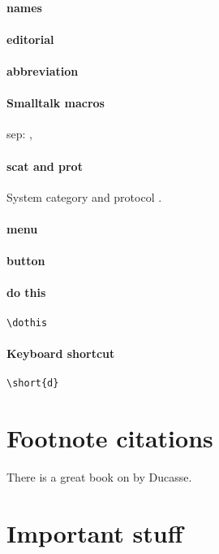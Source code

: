 \documentclass[a4paper,10pt,twoside]{book}
\begin{document}
\paragraph{names}
\SUnit
\xUnit
\st
\Squeak
\sq
\squeak
\paragraph{editorial}
\paragraph{abbreviation}
\ie
\eg
\etc
\paragraph{Smalltalk macros}
sep: \sep
\paragraph{scat and prot}
System category  and protocol .
\paragraph{menu}
\paragraph{button}
\paragraph{do this}
\verb|\dothis|
\ct{-->}
\paragraph{Keyboard shortcut}
\verb|\short{d}|
\ct{-->}
\section*{Footnote citations}
There is a great book on \sq by Ducasse\cite{Duca05j}.
\section*{Important stuff}
% 


\end{document}
